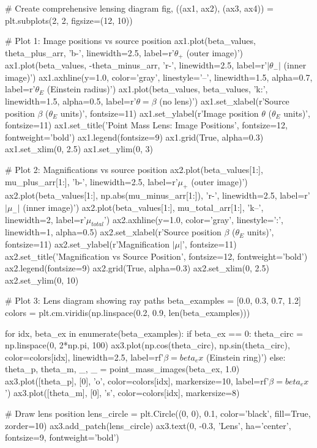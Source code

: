 \documentclass[11pt,a4paper]{article}
\begin{document}
\begin{pycode}
# Create comprehensive lensing diagram
fig, ((ax1, ax2), (ax3, ax4)) = plt.subplots(2, 2, figsize=(12, 10))

# Plot 1: Image positions vs source position
ax1.plot(beta_values, theta_plus_arr, 'b-', linewidth=2.5, label=r'$\theta_+$ (outer image)')
ax1.plot(beta_values, -theta_minus_arr, 'r-', linewidth=2.5, label=r'$|\theta_-|$ (inner image)')
ax1.axhline(y=1.0, color='gray', linestyle='--', linewidth=1.5, alpha=0.7, label=r'$\theta_E$ (Einstein radius)')
ax1.plot(beta_values, beta_values, 'k:', linewidth=1.5, alpha=0.5, label=r'$\theta = \beta$ (no lens)')
ax1.set_xlabel(r'Source position $\beta$ ($\theta_E$ units)', fontsize=11)
ax1.set_ylabel(r'Image position $\theta$ ($\theta_E$ units)', fontsize=11)
ax1.set_title('Point Mass Lens: Image Positions', fontsize=12, fontweight='bold')
ax1.legend(fontsize=9)
ax1.grid(True, alpha=0.3)
ax1.set_xlim(0, 2.5)
ax1.set_ylim(0, 3)

# Plot 2: Magnifications vs source position
ax2.plot(beta_values[1:], mu_plus_arr[1:], 'b-', linewidth=2.5, label=r'$\mu_+$ (outer image)')
ax2.plot(beta_values[1:], np.abs(mu_minus_arr[1:]), 'r-', linewidth=2.5, label=r'$|\mu_-|$ (inner image)')
ax2.plot(beta_values[1:], mu_total_arr[1:], 'k--', linewidth=2, label=r'$\mu_{total}$')
ax2.axhline(y=1.0, color='gray', linestyle=':', linewidth=1, alpha=0.5)
ax2.set_xlabel(r'Source position $\beta$ ($\theta_E$ units)', fontsize=11)
ax2.set_ylabel(r'Magnification $|\mu|$', fontsize=11)
ax2.set_title('Magnification vs Source Position', fontsize=12, fontweight='bold')
ax2.legend(fontsize=9)
ax2.grid(True, alpha=0.3)
ax2.set_xlim(0, 2.5)
ax2.set_ylim(0, 10)

# Plot 3: Lens diagram showing ray paths
beta_examples = [0.0, 0.3, 0.7, 1.2]
colors = plt.cm.viridis(np.linspace(0.2, 0.9, len(beta_examples)))

for idx, beta_ex in enumerate(beta_examples):
    if beta_ex == 0:
        theta_circ = np.linspace(0, 2*np.pi, 100)
        ax3.plot(np.cos(theta_circ), np.sin(theta_circ), color=colors[idx],
                linewidth=2.5, label=rf'$\beta={beta_ex}$ (Einstein ring)')
    else:
        theta_p, theta_m, _, _ = point_mass_images(beta_ex, 1.0)
        ax3.plot([theta_p], [0], 'o', color=colors[idx], markersize=10,
                label=rf'$\beta={beta_ex}$')
        ax3.plot([theta_m], [0], 's', color=colors[idx], markersize=8)

# Draw lens position
lens_circle = plt.Circle((0, 0), 0.1, color='black', fill=True, zorder=10)
ax3.add_patch(lens_circle)
ax3.text(0, -0.3, 'Lens', ha='center', fontsize=9, fontweight='bold')


\end{pycode}
\end{document}
